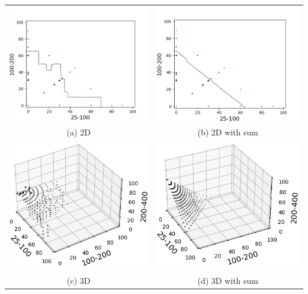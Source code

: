 \documentclass[10pt]{article}
\newenvironment{Figure}
  {\par\medskip\noindent\minipage{\linewidth}}
  {\endminipage\par\medskip}
\begin{document}
\begin{multicols}{2}
\begin{Figure}
  \begin{tabular}{cc}
    \includegraphics[width=0.45\columnwidth]{RF_2D.png} &   \includegraphics[width=0.45\columnwidth]{RF_2D_sum.png} \\
    (a) 2D & (b) 2D with sum \\[6pt]
    \includegraphics[width=0.45\columnwidth]{RF_3D.png} &   \includegraphics[width=0.45\columnwidth]{RF_3D_sum.png} \\
    (c) 3D & (d) 3D with sum \\[6pt]
  \end{tabular}
\end{Figure}


\end{multicols}
\end{document}
